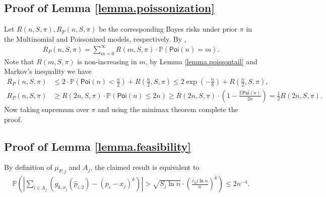 \documentclass[final,12pt]{colt2018} %
\def \bP {\mathbb{P}}
\def \bE {\mathbb{E}}
\def \spo {\mathsf{Poi}}
\begin{document}
\subsection{Proof of Lemma \ref{lemma.poissonization}}
Let $R(n,S,\pi), R_P(n,S,\pi)$ be the corresponding Bayes risks under prior $\pi$ in the Multinomial and Poissonized models, respectively. By \cite{Jiao--Venkat--Han--Weissman2015minimax}, 
\begin{align*}
R_P(n,S,\pi) = \sum_{m=0}^\infty R(m,S,\pi)\cdot \bP(\spo(n)=m).
\end{align*}
Note that $R(m,S,\pi)$ is non-increasing in $m$, by Lemma \ref{lemma.poissontail} and Markov's inequality we have
\begin{align*}
R_P(n,S,\pi) &\le 2\cdot \bP(\spo(n)<\frac{n}{2}) + R(\frac{n}{2},S,\pi) \le 2\exp(-\frac{n}{8}) + R(\frac{n}{2},S,\pi), \\
R_P(n,S,\pi) &\ge R(2n,S,\pi)\cdot \bP(\spo(n)\le 2n) \ge R(2n,S,\pi)\cdot\left(1-\frac{\bE\spo(n)}{2n}\right) = \frac{1}{2}R(2n,S,\pi).
\end{align*}
Now taking supremum over $\pi$ and using the minimax theorem \cite{Wald1950statistical} complete the proof.

\subsection{Proof of Lemma \ref{lemma.feasibility}}
By definition of $\mu_{P,j}$ and $A_j$, the claimed result is equivalent to
\begin{align*}
\mathbb{P}\left(\left|\sum_{i\in A_j} \left(g_{k,x_j}(\hat{p}_{i,2}) - (p_i-x_j)^k \right)\right| > \sqrt{S_j\ln n}\cdot \left(\frac{c_3j\ln n}{n}\right)^{k} \right) \le 2n^{-4}.
\end{align*}
\end{document}
